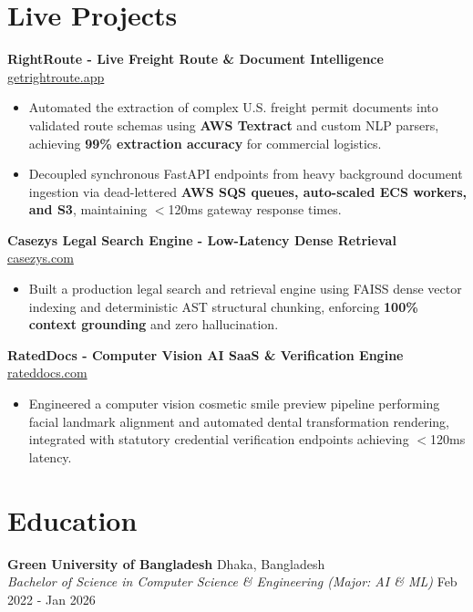 \documentclass[9.5pt,a4paper]{article}
\begin{document}
\section*{Live Projects}
\noindent
\textbf{RightRoute - Live Freight Route & Document Intelligence} \hfill \href{https://getrightroute.app}{getrightroute.app}
\begin{itemize}
    \item Automated the extraction of complex U.S. freight permit documents into validated route schemas using \textbf{AWS Textract} and custom NLP parsers, achieving \textbf{99\% extraction accuracy} for commercial logistics.
    \item Decoupled synchronous FastAPI endpoints from heavy background document ingestion via dead-lettered \textbf{AWS SQS queues, auto-scaled ECS workers, and S3}, maintaining $<$120ms gateway response times.
\end{itemize}
\vspace{0.6pt}
\noindent
\textbf{Casezys Legal Search Engine - Low-Latency Dense Retrieval} \hfill \href{https://casezys.com}{casezys.com}
\begin{itemize}
    \item Built a production legal search and retrieval engine using FAISS dense vector indexing and deterministic AST structural chunking, enforcing \textbf{100\% context grounding} and zero hallucination.
\end{itemize}
\vspace{0.6pt}
\noindent
\textbf{RatedDocs - Computer Vision AI SaaS \& Verification Engine} \hfill \href{https://rateddocs.com}{rateddocs.com}
\begin{itemize}
    \item Engineered a computer vision cosmetic smile preview pipeline performing facial landmark alignment and automated dental transformation rendering, integrated with statutory credential verification endpoints achieving $<$120ms latency.
\end{itemize}
\vspace{0.6pt}

\section*{Education}
\noindent
\textbf{Green University of Bangladesh} \hfill Dhaka, Bangladesh\\
\textit{Bachelor of Science in Computer Science \& Engineering (Major: AI \& ML)} \hfill Feb 2022 - Jan 2026
\end{document}
